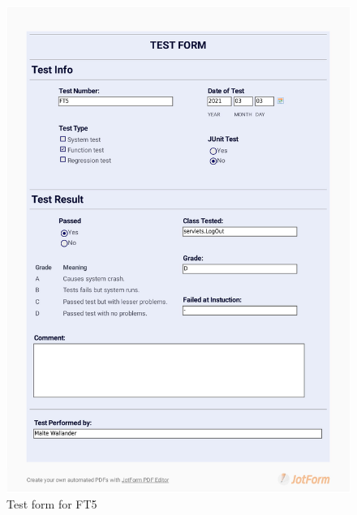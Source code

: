 \documentclass{article}
\begin{document}
\begin{figure}
     \centering
     \includegraphics[width=13cm]{images/2021-03-03_Malte_FT5-1}
     \renewcommand\figurename{Figure}
     \caption{Test form for FT5}
     \label{fig:my_label}
 \end{figure}
 
\end{document}
